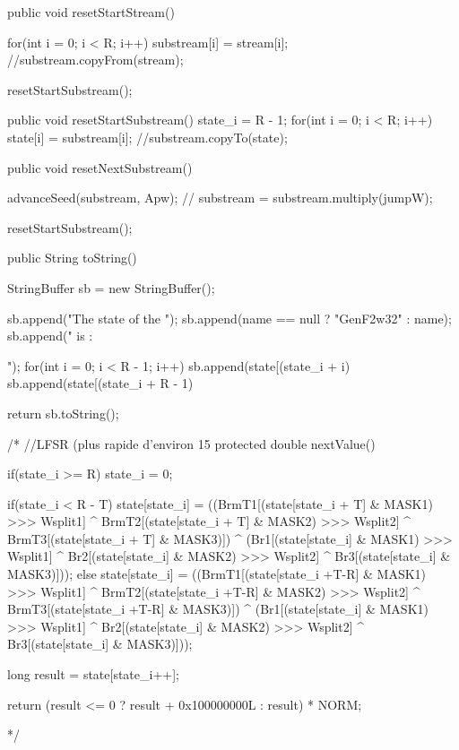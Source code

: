 \begin{code}\begin{hide}
   public void resetStartStream() {
      for(int i = 0; i < R; i++)
         substream[i] = stream[i];
      //substream.copyFrom(stream);

      resetStartSubstream();
   }

   public void resetStartSubstream() {
      state_i = R - 1;
      for(int i = 0; i < R; i++)
         state[i] = substream[i];
      //substream.copyTo(state);
   }

   public void resetNextSubstream() {
      advanceSeed(substream, Apw);
      //      substream = substream.multiply(jumpW);

      resetStartSubstream();
   }

   public String toString()  {
      StringBuffer sb = new StringBuffer();

      sb.append("The state of the ");
      sb.append(name == null ? "GenF2w32" : name);
      sb.append(" is : {");
      for(int i = 0; i < R - 1; i++)
         sb.append(state[(state_i + i) %
      sb.append(state[(state_i + R - 1) %

      return sb.toString();
   }

   /*
   //LFSR   (plus rapide d'environ 15%
   protected double nextValue()
   {
      if(state_i >= R)
         state_i = 0;


      if(state_i < R - T)
         state[state_i] = ((BrmT1[(state[state_i + T] & MASK1) >>> Wsplit1] ^
                            BrmT2[(state[state_i + T] & MASK2) >>> Wsplit2] ^
                            BrmT3[(state[state_i + T] & MASK3)]) ^
                           (Br1[(state[state_i] & MASK1) >>> Wsplit1] ^
                            Br2[(state[state_i] & MASK2) >>> Wsplit2] ^
                            Br3[(state[state_i] & MASK3)]));
      else
         state[state_i] = ((BrmT1[(state[state_i +T-R] & MASK1) >>> Wsplit1] ^
                            BrmT2[(state[state_i +T-R] & MASK2) >>> Wsplit2] ^
                            BrmT3[(state[state_i +T-R] & MASK3)]) ^
                           (Br1[(state[state_i] & MASK1) >>> Wsplit1] ^
                            Br2[(state[state_i] & MASK2) >>> Wsplit2] ^
                            Br3[(state[state_i] & MASK3)]));

      long result = state[state_i++];

      return (result <= 0 ? result + 0x100000000L : result) * NORM;
   }
   */


}
\end{hide}
\end{code}
